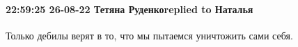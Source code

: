  
 
 
 
 

\paragraph{22:59:25 26-08-22 Тетяна Руденкоreplied to Наталья}

Только дебилы верят в то, что мы пытаемся уничтожить сами себя.
